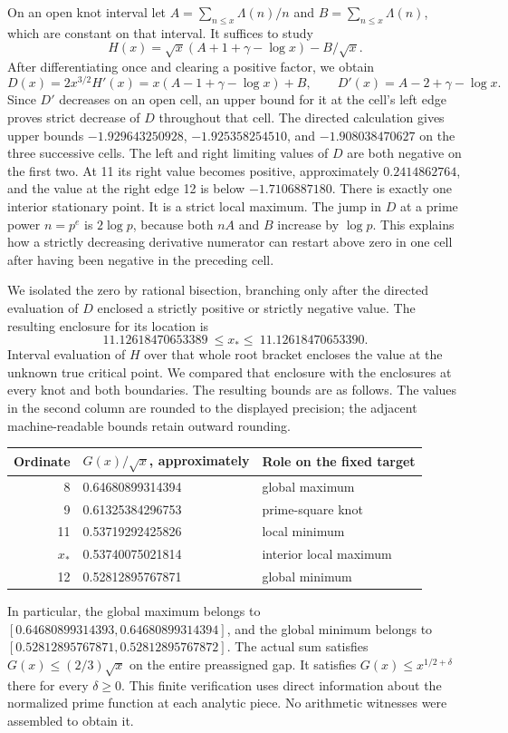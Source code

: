 \documentclass[12pt,letterpaper]{article}
\begin{document}
On an open knot interval let \(A=\sum_{n\le x}\Lambda(n)/n\) and \(B=\sum_{n\le x}\Lambda(n)\), which are constant on that interval. It suffices to study
\[
 H(x)=\sqrt{x}(A+1+\gamma-\log x)-B/\sqrt{x}.
\]
After differentiating once and clearing a positive factor, we obtain
\[
 D(x)=2x^{3/2}H'(x)=x(A-1+\gamma-\log x)+B,\qquad
 D'(x)=A-2+\gamma-\log x .
\]
Since \(D'\) decreases on an open cell, an upper bound for it at the cell's left edge proves strict decrease of \(D\) throughout that cell. The directed calculation gives upper bounds \(-1.929643250928\), \(-1.925358254510\), and \(-1.908038470627\) on the three successive cells. The left and right limiting values of \(D\) are both negative on the first two. At 11 its right value becomes positive, approximately \(0.2414862764\), and the value at the right edge 12 is below \(-1.7106887180\). There is exactly one interior stationary point. It is a strict local maximum. The jump in \(D\) at a prime power \(n=p^e\) is \(2\log p\), because both \(nA\) and \(B\) increase by \(\log p\). This explains how a strictly decreasing derivative numerator can restart above zero in one cell after having been negative in the preceding cell.

We isolated the zero by rational bisection, branching only after the directed evaluation of \(D\) enclosed a strictly positive or strictly negative value. The resulting enclosure for its location is
\[
              11.12618470653389\ \le x_\ast\le\ 11.12618470653390 .
\]
Interval evaluation of \(H\) over that whole root bracket encloses the value at the unknown true critical point. We compared that enclosure with the enclosures at every knot and both boundaries. The resulting bounds are as follows. The values in the second column are rounded to the displayed precision; the adjacent machine-readable bounds retain outward rounding.
\begin{center}\begin{tabular}{rll}
\toprule
Ordinate&\(G(x)/\sqrt{x}\), approximately&Role on the fixed target\\
\midrule
8&0.64680899314394&global maximum\\
9&0.61325384296753&prime-square knot\\
11&0.53719292425826&local minimum\\
\(x_\ast\)&0.53740075021814&interior local maximum\\
12&0.52812895767871&global minimum\\
\bottomrule
\end{tabular}\end{center}
In particular, the global maximum belongs to \([0.64680899314393,0.64680899314394]\), and the global minimum belongs to \([0.52812895767871,0.52812895767872]\). The actual sum satisfies \(G(x)\le(2/3)\sqrt{x}\) on the entire preassigned gap. It satisfies \(G(x)\le x^{1/2+\delta}\) there for every \(\delta\ge0\). This finite verification uses direct information about the normalized prime function at each analytic piece. No arithmetic witnesses were assembled to obtain it.
\end{document}
